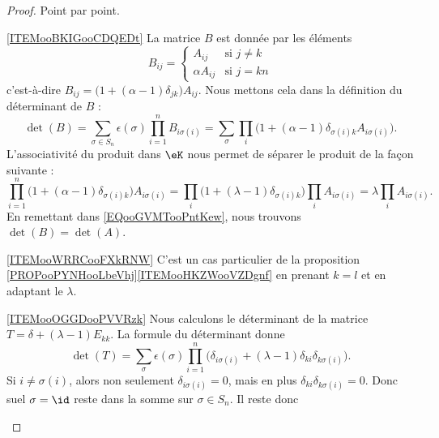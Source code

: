\begin{proof}
    Point par point.
    \begin{subproof}
        \item[\ref{ITEMooBKIGooCDQEDt}]
            La matrice \( B\) est donnée par les éléments
            \begin{equation}
                B_{ij}=\begin{cases}
                    A_{ij}    &   \text{si } j\neq k\\
                    \alpha A_{ij}    &    \text{si } j=kn
                \end{cases}
            \end{equation}
            c'est-à-dire \( B_{ij}=\big( 1+(\alpha-1)\delta_{jk} \big)A_{ij}\). Nous mettons cela dans la définition du déterminant de \( B\) :
            \begin{equation}        \label{EQooGVMTooPntKew}
                \det(B)=\sum_{\sigma\in S_n}\epsilon(\sigma)\prod_{i=1}^nB_{i\sigma(i)}=\sum_{\sigma}\prod_i\big( 1+(\alpha-1)\delta_{\sigma(i)k}A_{i\sigma(i)} \big).
            \end{equation}
            L'associativité du produit dans \( \eK\) nous permet de séparer le produit de la façon suivante :
            \begin{equation}
                \prod_{i=1}^n\big( 1+(\alpha-1)\delta_{\sigma(i)k} \big)A_{i\sigma(i)}=\prod_i\big( 1+(\lambda-1)\delta_{\sigma(i)k} \big)\prod_iA_{i\sigma(i)}=\lambda\prod_iA_{i\sigma(i)}.
            \end{equation}
            En remettant dans \eqref{EQooGVMTooPntKew}, nous trouvons \( \det(B)=\det(A)\).
        \item[\ref{ITEMooWRRCooFXkRNW}]
            C'est un cas particulier de la proposition \ref{PROPooPYNHooLbeVhj}\ref{ITEMooHKZWooVZDgnf} en prenant \( k=l\) et en adaptant le \( \lambda\).
        \item[\ref{ITEMooOGGDooPVVRzk}]
            Nous calculons le déterminant de la matrice \( T=\delta+(\lambda-1)E_{kk}\). La formule du déterminant donne
            \begin{equation}
                \det(T)=\sum_{\sigma}\epsilon(\sigma)\prod_{i=1}^n\big( \delta_{i\sigma(i)}+(\lambda-1)\delta_{ki}\delta_{k\sigma(i)} \big).
            \end{equation}
            Si \( i\neq \sigma(i)\), alors non seulement \( \delta_{i\sigma(i)}=0\), mais en plus \( \delta_{ki}\delta_{k\sigma(i)}=0\). Donc suel \( \sigma=\id\) reste dans la somme sur \( \sigma\in S_n\). Il reste donc

\end{subproof}
\end{proof}
